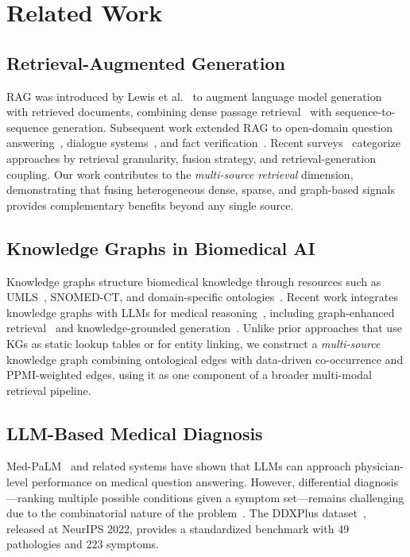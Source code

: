 \documentclass[preprint,12pt]{elsarticle}
\begin{document}
\section{Related Work}
\label{sec:related}

\subsection{Retrieval-Augmented Generation}

RAG was introduced by Lewis et al.~\cite{lewis2020retrieval} to augment language model generation with retrieved documents, combining dense passage retrieval~\cite{karpukhin2020dense} with sequence-to-sequence generation. Subsequent work extended RAG to open-domain question answering~\cite{izacard2021leveraging}, dialogue systems~\cite{shuster2021retrieval}, and fact verification~\cite{thorne2018fever}. Recent surveys~\cite{gao2023retrieval,zhao2024retrieval} categorize approaches by retrieval granularity, fusion strategy, and retrieval-generation coupling. Our work contributes to the \emph{multi-source retrieval} dimension, demonstrating that fusing heterogeneous dense, sparse, and graph-based signals provides complementary benefits beyond any single source.

\subsection{Knowledge Graphs in Biomedical AI}

Knowledge graphs structure biomedical knowledge through resources such as UMLS~\cite{bodenreider2004unified}, SNOMED-CT, and domain-specific ontologies~\cite{santos2022knowledge,chandak2023building}. Recent work integrates knowledge graphs with LLMs for medical reasoning~\cite{pan2024unifying}, including graph-enhanced retrieval~\cite{he2024gretriever} and knowledge-grounded generation~\cite{yasunaga2022deep}. Unlike prior approaches that use KGs as static lookup tables or for entity linking, we construct a \emph{multi-source} knowledge graph combining ontological edges with data-driven co-occurrence and PPMI-weighted edges, using it as one component of a broader multi-modal retrieval pipeline.

\subsection{LLM-Based Medical Diagnosis}

Med-PaLM~\cite{singhal2023large} and related systems have shown that LLMs can approach physician-level performance on medical question answering. However, differential diagnosis---ranking multiple possible conditions given a symptom set---remains challenging due to the combinatorial nature of the problem~\cite{mcduff2023towards}. The DDXPlus dataset~\cite{fansi2022ddxplus}, released at NeurIPS 2022, provides a standardized benchmark with 49 pathologies and 223 symptoms.
\end{document}
